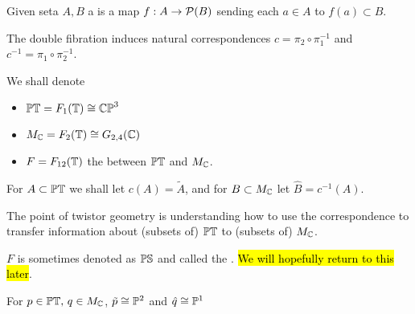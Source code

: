 \documentclass{article}
\begin{document}
\begin{definition}
	Given seta $A,B$ a   is a map $f: A \to \mathcal{P}(B)$ sending each $a \in A$ to $f(a) \subset B$.
\end{definition}
The double fibration induces natural correspondences $c=\pi_2 \circ \pi_1^{-1}$ and $c^{-1} = \pi_1 \circ \pi_2^{-1}$. 
\begin{notation}
	We shall denote 
	\begin{itemize}
		\item $\mathbb{PT}=F_1(\mathbb{T}) \cong \mathbb{CP}^3$ 
		\item $M_{\mathbb{C}} = F_2(\mathbb{T}) \cong G_{2,4}(\mathbb{C})$ 
		\item $F = F_{12}(\mathbb{T})$ the  between $\mathbb{PT}$ and $M_{\mathbb{C}}$. 
	\end{itemize}
For $A \subset \mathbb{PT}$ we shall let $c(A) = \tilde{A}$, and for $B \subset M_{\mathbb{C}}$ let $\hat{B} = c^{-1}(A)$. 
\end{notation}

\begin{idea}
	The point of twistor geometry is understanding how to use the correspondence
	to transfer information about (subsets of) $\mathbb{PT}$ to (subsets of) $M_{\mathbb{C}}$. 
\end{idea}

\begin{remark}
	$F$ is sometimes denoted as $\mathbb{PS}$ and called the . \hl{We will hopefully return to this later}. 
\end{remark}

\begin{prop}
	For $p \in \mathbb{PT}, \, q \in M_{\mathbb{C}}$, $\tilde{p} \cong \mathbb{P}^2$ and $\hat{q} \cong \mathbb{P}^1$
\end{prop}
\end{document}
